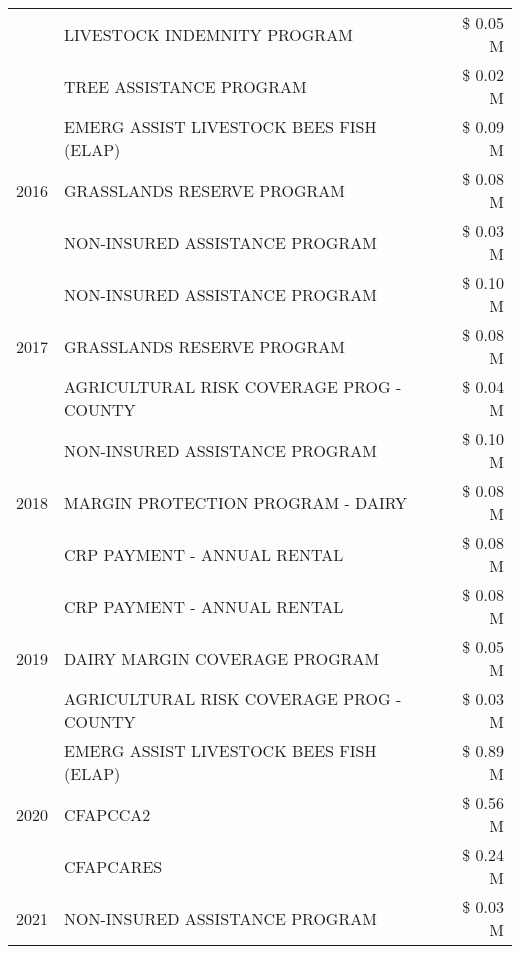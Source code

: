 \begin{tabular}{llr}
 & LIVESTOCK INDEMNITY PROGRAM & \$ 0.05 M \\
 & TREE ASSISTANCE PROGRAM & \$ 0.02 M \\
\cline{1-3}
\multirow[t]{3}{*}{2016} & EMERG ASSIST LIVESTOCK BEES FISH (ELAP) & \$ 0.09 M \\
 & GRASSLANDS RESERVE PROGRAM & \$ 0.08 M \\
 & NON-INSURED ASSISTANCE PROGRAM & \$ 0.03 M \\
\cline{1-3}
\multirow[t]{3}{*}{2017} & NON-INSURED ASSISTANCE PROGRAM & \$ 0.10 M \\
 & GRASSLANDS RESERVE PROGRAM & \$ 0.08 M \\
 & AGRICULTURAL RISK COVERAGE PROG - COUNTY & \$ 0.04 M \\
\cline{1-3}
\multirow[t]{3}{*}{2018} & NON-INSURED ASSISTANCE PROGRAM & \$ 0.10 M \\
 & MARGIN PROTECTION PROGRAM - DAIRY & \$ 0.08 M \\
 & CRP PAYMENT - ANNUAL RENTAL & \$ 0.08 M \\
\cline{1-3}
\multirow[t]{3}{*}{2019} & CRP PAYMENT - ANNUAL RENTAL & \$ 0.08 M \\
 & DAIRY MARGIN COVERAGE PROGRAM & \$ 0.05 M \\
 & AGRICULTURAL RISK COVERAGE PROG - COUNTY & \$ 0.03 M \\
\cline{1-3}
\multirow[t]{3}{*}{2020} & EMERG ASSIST LIVESTOCK BEES FISH (ELAP) & \$ 0.89 M \\
 & CFAPCCA2 & \$ 0.56 M \\
 & CFAPCARES & \$ 0.24 M \\
\cline{1-3}
2021 & NON-INSURED ASSISTANCE PROGRAM & \$ 0.03 M \\
\cline{1-3}
\bottomrule
\end{tabular}
